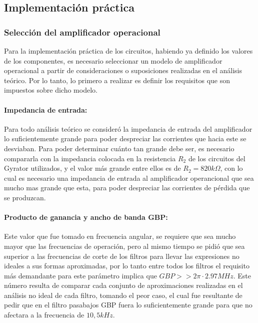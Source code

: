 \subsection{Implementaci\'on pr\'actica}

\subsubsection{Selecci\'on del amplificador operacional}
Para la implementaci\'on pr\'actica de los circuitos, habiendo ya definido los valores de los componentes, es necesario seleccionar un modelo de amplificador operacional a partir de 
consideraciones o suposiciones realizadas en el an\'alisis te\'orico. Por lo tanto, lo primero a realizar es definir los requisitos que son impuestos sobre dicho modelo.

\paragraph*{Impedancia de entrada:} Para todo an\'alisis te\'orico se consider\'o la impedancia de entrada del amplificador lo suficientemente grande para poder despreciar las corrientes que hacia este se desviaban.
Para poder determinar cu\'anto tan grande debe ser, es necesario compararla con la impedancia colocada en la resistencia $R_2$ de los circuitos del Gyrator utilizados, y el valor m\'as grande entre ellos es de $R_2 = 820 k \Omega$, con lo cual
es necesario una impedancia de entrada al amplificador operancional que sea mucho mas grande que esta, para poder despreciar las corrientes de p\'erdida que se produzcan.

\paragraph*{Producto de ganancia y ancho de banda GBP:} Este valor que fue tomado en frecuencia angular, se requiere que sea mucho mayor que las frecuencias de operaci\'on, pero al mismo tiempo se pidi\'o que sea superior a las frecuencias de corte de los filtros
para llevar las expresiones no ideales a sus formas aproximadas, por lo tanto entre todos los filtros el requisito m\'as demandante para este par\'ametro implica que $GBP >> 2 \pi \cdot 2.97MHz$. Este n\'umero resulta de comparar cada conjunto de aproximaciones realizadas
en el an\'alisis no ideal de cada filtro, tomando el peor caso, el cual fue resultante de pedir que en el filtro pasabajos GBP fuera lo suficientemente grande para que no afectara a la frecuencia de $10,5kHz$.

